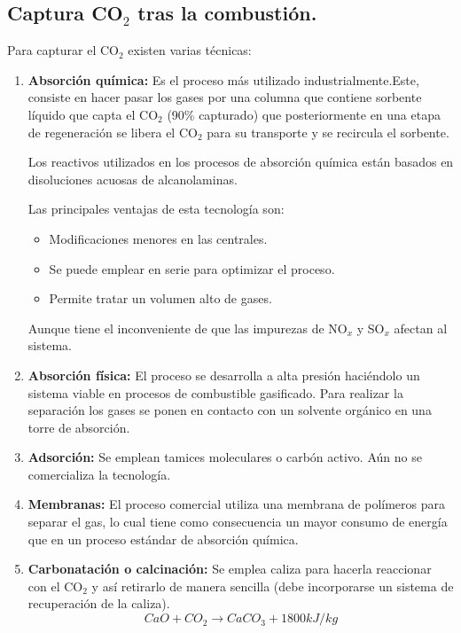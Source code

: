 \subsection{Captura CO$_2$ tras la combustión.}
Para capturar el CO$_2$ existen varias técnicas:
\begin{enumerate}
	\item \textbf{Absorción química:}
		Es el proceso más utilizado industrialmente.Este, consiste en hacer pasar los gases por una columna que contiene sorbente líquido que capta el CO$_2$ (90\% capturado) que posteriormente en una etapa de regeneración se libera el CO$_2$ para su transporte y se recircula el sorbente. 
		
		Los reactivos utilizados en los procesos de absorción química están basados en disoluciones acuosas de
		alcanolaminas.
		
		Las principales ventajas de esta tecnología son:
		\begin{itemize}
			\item Modificaciones menores en las centrales.
			\item Se puede emplear en serie para optimizar el proceso.
			\item Permite tratar un volumen alto de gases.
		\end{itemize}
		Aunque tiene el inconveniente de que las impurezas de NO$_x$ y SO$_x$ afectan al sistema.
	\item \textbf{Absorción física:}
		El proceso se desarrolla a alta presión haciéndolo un sistema viable en procesos de combustible gasificado. Para realizar la separación los gases se ponen en contacto con un solvente orgánico en una torre de absorción.
	\item \textbf{Adsorción:}
		Se emplean tamices moleculares o carbón activo. Aún no se comercializa la tecnología.
	\item \textbf{Membranas:}
		El proceso comercial utiliza una membrana de polímeros para separar el gas, lo cual tiene como
		consecuencia un mayor consumo de energía que en un proceso estándar de absorción química.
	\item \textbf{Carbonatación o calcinación:}
		Se emplea caliza para hacerla reaccionar con el CO$_2$ y así retirarlo de manera sencilla (debe incorporarse un sistema de recuperación de la caliza).
		\[CaO+CO_2\rightarrow CaCO_3+1800kJ/kg\]
\end{enumerate}
